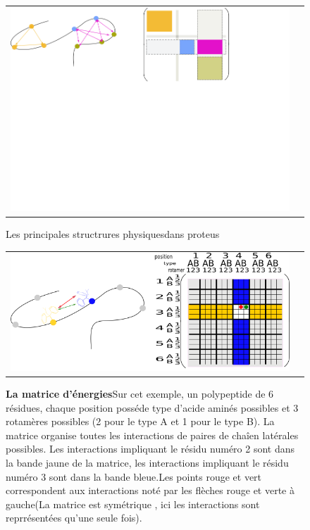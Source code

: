    \begin{figure}[t]
     \centering
     \begin{tabular}{cc}
       \includegraphics[width=12cm]{graphe/proteus/grp_matrix.png} &
     \end{tabular}
     
     \caption{Les principales structrures \og physiques\fg dans proteus}
\label{graph:struct_Phy}
   \end{figure}
   


   \begin{figure}[t]
     \centering
     \begin{tabular}{cc}
       \includegraphics[width=12cm]{graphe/proteus/matrice.png} &
     \end{tabular}
     
     \caption{\textbf{La matrice d'énergies}Sur cet exemple, un polypeptide de 6 résidues, chaque position posséde type d'acide aminés possibles et 3 rotamères possibles (2 pour le type A et 1 pour le type B). La matrice organise toutes les interactions de paires de chaîen latérales possibles. Les interactions impliquant le résidu numéro 2 sont dans la bande jaune de la matrice, les interactions impliquant le résidu numéro 3 sont dans la bande bleue.Les points rouge et vert correspondent aux interactions  noté par les flèches rouge et verte à gauche(La matrice est symétrique , ici les interactions sont reprrésentées qu'une seule fois).}
\label{graph:MAt_ener}
   \end{figure}
   

